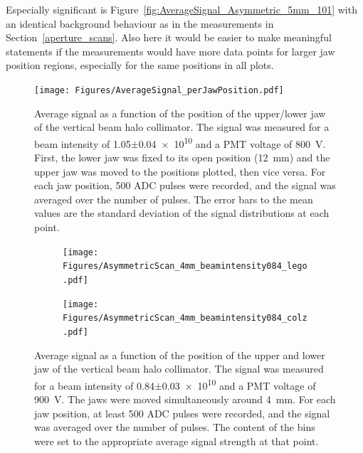 Especially significant is Figure~\ref{fig:AverageSignal_Asymmetric_5mm_101} with an identical background behaviour as in the measurements in Section~\ref{aperture_scans}. Also here it would be easier to make meaningful statements if the measurements would have more data points for larger jaw position regions, especially for the same positions in all plots.
\begin{figure}
\centering
\texttt{[image: Figures/AverageSignal\_perJawPosition.pdf]}
\caption[RHUL Cherenkov detector signal vs. collimator half aperture]{Average signal as a function of the position of the upper/lower jaw of the vertical beam halo collimator. The signal was measured for a beam intensity of \num{1.05}$\pm$\num{0.04e10} and a PMT voltage of \SI{800}{\volt}. First, the lower jaw was fixed to its open position (\SI{12}{\milli\metre}) and the upper jaw was moved to the positions plotted, then vice versa. For each jaw position, 500 ADC pulses were recorded, and the signal was averaged over the number of pulses. The error bars to the mean values are the standard deviation of the signal distributions at each point.}
\label{fig:AverageSignal_HalfAperture}
\end{figure}
\begin{figure}
\begin{subfigure}[b]{0.5\textwidth}
\texttt{[image: Figures/AsymmetricScan\_4mm\_beamintensity084\_lego.pdf]}
\end{subfigure}
\begin{subfigure}[b]{0.5\textwidth}
\texttt{[image: Figures/AsymmetricScan\_4mm\_beamintensity084\_colz.pdf]}
\end{subfigure}
\caption[RHUL Cherenkov detector signal for certain upper/lower jaw positions around \SI{4}{\milli\metre}, for a beam intensity of \num{0.84}$\pm$\num{0.03e10}]{Average signal as a function of the position of the upper and lower jaw of the vertical beam halo collimator. The signal was measured for a beam intensity of \num{0.84}$\pm$\num{0.03e10} and a PMT voltage of \SI{900}{\volt}. The jaws were moved simultaneously around \SI{4}{\milli\metre}. For each jaw position, at least 500 ADC pulses were recorded, and the signal was averaged over the number of pulses. The content of the bins were set to the appropriate average signal strength at that point.}
\label{fig:AverageSignal_Asymmetric_4mm_084}
\end{figure}
